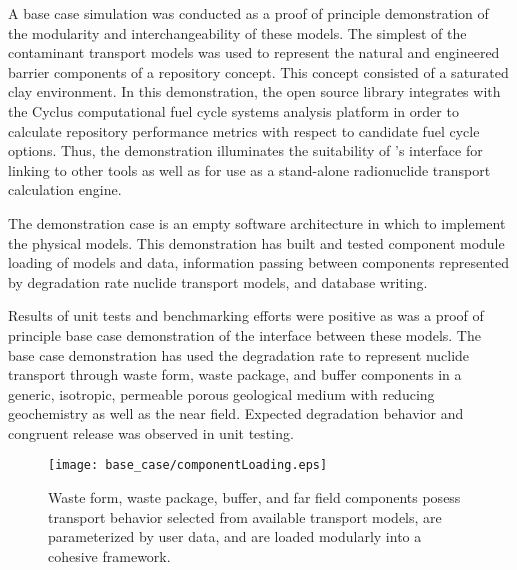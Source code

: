 
A base case simulation was conducted as a proof of principle demonstration of 
the modularity and interchangeability of these models. The simplest of the 
contaminant transport models was used to represent the natural and engineered 
barrier components of a repository concept. This concept consisted of a  
saturated clay environment.  In this demonstration, the \Cyder open source 
library integrates with the Cyclus computational fuel cycle systems analysis 
platform in order to calculate repository performance metrics with respect to 
candidate fuel cycle options.  Thus, the demonstration illuminates the 
suitability of \Cyder's interface for linking to other tools as well as for use 
as a stand-alone radionuclide transport calculation engine.

The demonstration case is an empty software architecture in which to implement 
the physical models. This demonstration has built and tested component module 
loading of models and data, information passing between components represented by 
degradation rate nuclide transport models, and database writing.

Results of unit tests and benchmarking efforts were positive as was a proof of 
principle base case demonstration of the interface between these models. The 
base case demonstration has used the degradation rate to represent nuclide 
transport through waste form, waste package, and buffer components in a generic, 
isotropic, permeable porous geological medium with reducing geochemistry as well 
as the near field. Expected degradation behavior and congruent release was 
observed in unit testing.  

  \begin{figure}[htbp!]
    \begin{center}
      \texttt{[image: base\_case/componentLoading.eps]}
      \caption{Waste form, waste package, buffer, and far field components 
        posess transport behavior selected from available transport 
        models, are parameterized by user data, and are loaded modularly 
      into a cohesive framework.}
    \end{center}
  \end{figure}

  
